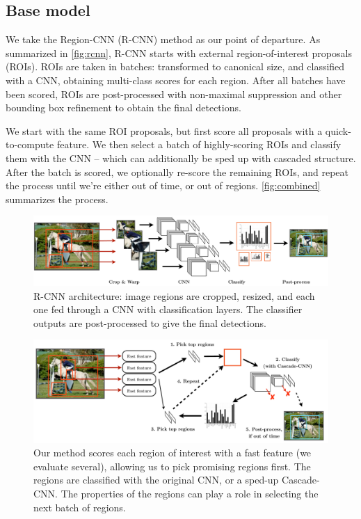 \subsection{Base model}

We take the Region-CNN (R-CNN) \cite{Girshick-CVPR-2014} method as our point of departure.
As summarized in \autoref{fig:rcnn}, R-CNN starts with external region-of-interest proposals (ROIs).
ROIs are taken in batches: transformed to canonical size, and classified with a CNN, obtaining multi-class scores for each region.
After all batches have been scored, ROIs are post-processed with non-maximal suppression and other bounding box refinement to obtain the final detections.

We start with the same ROI proposals, but first score all proposals with a quick-to-compute feature.
We then select a batch of highly-scoring ROIs and classify them with the CNN -- which can additionally be sped up with cascaded structure.
After the batch is scored, we optionally re-score the remaining ROIs, and repeat the process until we're either out of time, or out of regions.
\autoref{fig:combined} summarizes the process.



\begin{figure}[h!]
\begin{center}
\includegraphics[width=0.98\columnwidth]{figures/rcnn.pdf}
\caption{
R-CNN architecture: image regions are cropped, resized, and each one fed through a CNN with classification layers.
The classifier outputs are post-processed to give the final detections.
}\label{fig:rcnn}
\end{center}
\end{figure}

\begin{figure}[h!]
\begin{center}
\includegraphics[width=0.98\columnwidth]{figures/combined.pdf}
\caption{
Our method scores each region of interest with a fast feature (we evaluate several), allowing us to pick promising regions first.
The regions are classified with the original CNN, or a sped-up Cascade-CNN.
The properties of the regions can play a role in selecting the next batch of regions.
}\label{fig:combined}
\end{center}
\end{figure}

